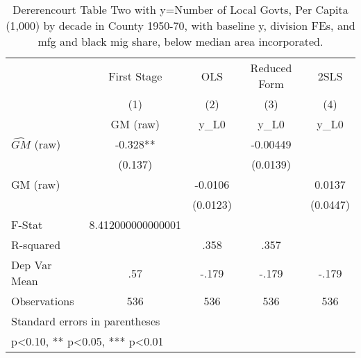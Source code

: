 \begin{table}[htbp]\centering
\def\sym#1{\ifmmode^{#1}\else\(^{#1}\)\fi}
\caption{Dererencourt Table Two with y=Number of Local Govts, Per Capita (1,000) by decade in County 1950-70, with baseline y, division FEs, and mfg and black mig share, below median area incorporated.}
\begin{tabular}{l*{4}{c}}
\toprule
                    & First Stage   &         OLS   &Reduced Form   &        2SLS   \\
                    &\multicolumn{1}{c}{(1)}&\multicolumn{1}{c}{(2)}&\multicolumn{1}{c}{(3)}&\multicolumn{1}{c}{(4)}\\
                    &\multicolumn{1}{c}{GM  (raw)}&\multicolumn{1}{c}{y\_L0}&\multicolumn{1}{c}{y\_L0}&\multicolumn{1}{c}{y\_L0}\\
\midrule
$\hat{GM}$ (raw)    &      -0.328** &               &    -0.00449   &               \\
                    &     (0.137)   &               &    (0.0139)   &               \\
\addlinespace
GM  (raw)           &               &     -0.0106   &               &      0.0137   \\
                    &               &    (0.0123)   &               &    (0.0447)   \\
\midrule
F-Stat              &8.412000000000001   &               &               &               \\
R-squared           &               &        .358   &        .357   &               \\
Dep Var Mean        &         .57   &       -.179   &       -.179   &       -.179   \\
Observations        &         536   &         536   &         536   &         536   \\
\bottomrule
\multicolumn{5}{l}{\footnotesize Standard errors in parentheses}\\
\multicolumn{5}{l}{\footnotesize * p<0.10, ** p<0.05, *** p<0.01}\\
\end{tabular}
\end{table}
